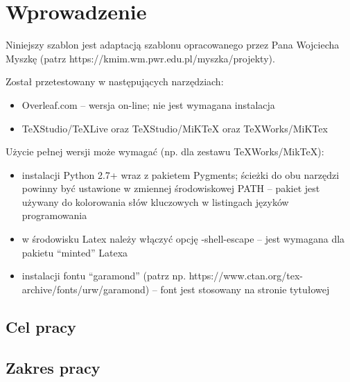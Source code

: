 
\chapter*{Wprowadzenie}

Niniejszy szablon jest adaptacją szablonu opracowanego przez Pana Wojciecha Myszkę (patrz https://kmim.wm.pwr.edu.pl/myszka/projekty).

Został przetestowany w następujących narzędziach:
\begin{itemize}
\item Overleaf.com -- wersja on-line; nie jest wymagana instalacja
\item TeXStudio/TeXLive oraz TeXStudio/MiKTeX oraz TeXWorks/MiKTex
\end{itemize}

Użycie pełnej wersji może wymagać (np. dla zestawu TeXWorks/MikTeX):
\begin{itemize}
\item instalacji Python 2.7+ wraz z pakietem Pygments; ścieżki do obu narzędzi powinny być ustawione w zmiennej środowiskowej PATH -- pakiet jest używany do kolorowania słów kluczowych w listingach języków programowania
\item w środowisku Latex należy włączyć opcję -shell-escape  -- jest wymagana dla pakietu ``minted'' Latexa 
\item instalacji fontu ``garamond'' (patrz np. https://www.ctan.org/tex-archive/fonts/urw/garamond) -- font jest stosowany na stronie tytułowej
\end{itemize}

\section*{Cel pracy}

\lipsum[5]

\section*{Zakres pracy}

\lipsum[6]